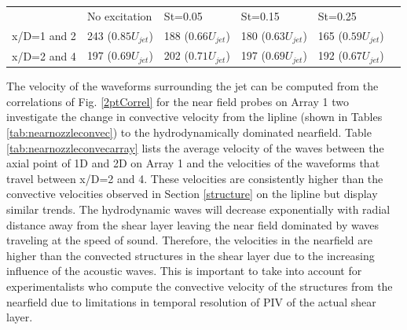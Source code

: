 \documentclass[english]{aiaa-tc}
\begin{document}
\begin{center}
	\begin{tabular}{|l|l|l|l|l|l}
		 & No excitation & St=0.05 & St=0.15 & St=0.25 \\
		x/D=1 and 2 & 243 ($0.85U_{jet}$) & 188 ($0.66U_{jet}$) & 180 ($0.63U_{jet}$) & 165 ($0.59U_{jet}$) \\
		x/D=2 and 4 & 197 ($0.69U_{jet}$) & 202 ($0.71U_{jet}$) & 197 ($0.69U_{jet}$) & 192 ($0.67U_{jet}$) \\
	\end{tabular}
	\label{tab:nearnozzleconvecarray}
\end{center}
The velocity of the waveforms surrounding the jet can be computed from the correlations of Fig. \ref{2ptCorrel} for the near field probes on Array 1 two investigate the change in convective velocity from the lipline (shown in Tables \ref{tab:nearnozzleconvec}) to the hydrodynamically dominated nearfield. Table \ref{tab:nearnozzleconvecarray} lists the average velocity of the waves between the axial point of 1D and 2D on Array 1 and the velocities of the waveforms that travel between x/D=2 and 4. These velocities are consistently higher than the convective velocities observed in Section \ref{structure} on the lipline but display similar trends. The hydrodynamic waves will decrease exponentially with radial distance away from the shear layer leaving the near field dominated by waves traveling at the speed of sound. Therefore, the velocities in the nearfield are higher than the convected structures in the shear layer due to the increasing influence of the acoustic waves. This is important to take into account for experimentalists who compute the convective velocity of the structures from the nearfield due to limitations in temporal resolution of PIV of the actual shear layer.

\end{document}
